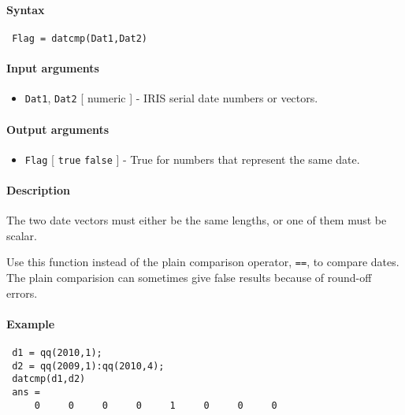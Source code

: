 


	\paragraph{Syntax}
 
 \begin{verbatim}
 Flag = datcmp(Dat1,Dat2)
 \end{verbatim}
 
 \paragraph{Input arguments}
 
 \begin{itemize}
 \item
   \texttt{Dat1}, \texttt{Dat2} {[} numeric {]} - IRIS serial date
   numbers or vectors.
 \end{itemize}
 
 \paragraph{Output arguments}
 
 \begin{itemize}
 \item
   \texttt{Flag} {[} \texttt{true} \textbar{} \texttt{false} {]} - True
   for numbers that represent the same date.
 \end{itemize}
 
 \paragraph{Description}
 
 The two date vectors must either be the same lengths, or one of them
 must be scalar.
 
 Use this function instead of the plain comparison operator, \texttt{==},
 to compare dates. The plain comparision can sometimes give false results
 because of round-off errors.
 
 \paragraph{Example}
 
 \begin{verbatim}
 d1 = qq(2010,1);
 d2 = qq(2009,1):qq(2010,4);
 datcmp(d1,d2)
 ans =
     0     0     0     0     1     0     0     0
 \end{verbatim}


